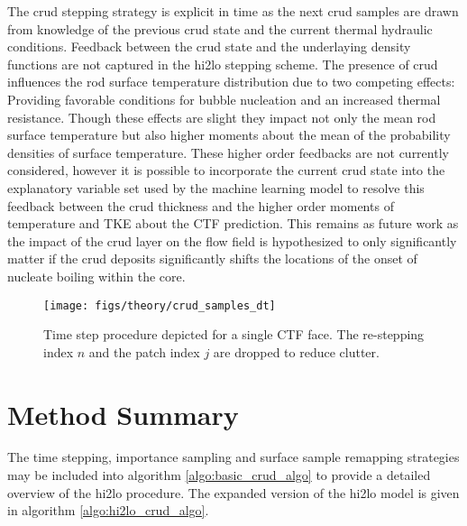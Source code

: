 The crud stepping strategy is explicit in time as the next crud samples are drawn from knowledge of the previous crud state and the current thermal hydraulic conditions.  Feedback between the crud state and the underlaying density functions are not captured in the hi2lo stepping scheme.  The presence of crud influences the rod surface temperature distribution due to two competing effects: Providing favorable conditions for bubble nucleation and an increased thermal resistance.  Though these effects are slight they impact not only the mean rod surface temperature but also higher moments about the mean of the probability densities of surface temperature.  These higher order feedbacks are not currently considered, however it is possible to incorporate the current crud state into the explanatory variable set used by the machine learning model to resolve this feedback between the crud thickness and the higher order moments of temperature and TKE about the CTF prediction.  This remains as future work as the impact of the crud layer on the flow field is hypothesized to only significantly matter if the crud deposits significantly shifts the locations of the onset of nucleate boiling within the core.

\begin{figure}[H]
    \centering
    \texttt{[image: figs/theory/crud\_samples\_dt]}
    \caption[Time step procedure depicted for a single CTF face]{Time step procedure depicted for a single CTF face.  The re-stepping index $n$ and the patch index $j$ are dropped to reduce clutter.}
    \label{fig:crudsamplesdt}
\end{figure}

\section{Method Summary}

The time stepping, importance sampling and surface sample remapping strategies may be included into algorithm \ref{algo:basic_crud_algo} to provide a detailed overview of the hi2lo procedure.  The expanded version of the hi2lo model is given in algorithm \ref{algo:hi2lo_crud_algo}.

